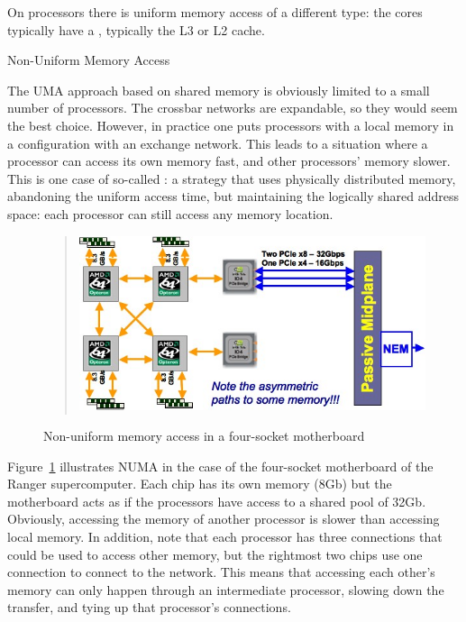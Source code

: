 On  processors there is uniform memory access of
a different type: the cores typically have a
, typically the L3 or L2 cache.

 {Non-Uniform Memory Access}
\label{sec:numa}

The \ac{UMA} approach based on shared memory 
is obviously limited to a small number of
processors. The crossbar networks are expandable, so they would seem 
the best choice. 
However, in practice one puts 
processors with a local memory in a configuration with an exchange
network. This leads to a situation where a processor can access its
own memory fast, and other processors' memory slower.
This is one case of so-called : a strategy that
uses physically distributed memory, abandoning the uniform access
time, but maintaining the logically shared address space: each processor can
still access any memory location.

\begin{figure}
  \begin{quote}
  \includegraphics[scale=.6]{graphics/ranger-numa}
  \end{quote}
  \caption{Non-uniform memory access in a four-socket motherboard}
  \label{fig:ranger-numa}
\end{figure}

Figure~\ref{fig:ranger-numa} illustrates \ac{NUMA} in the case of the
four-socket motherboard of the Ranger supercomputer. Each chip has its
own memory (8Gb) but the motherboard acts as if the processors have
access to a shared pool of 32Gb. Obviously, accessing the memory of
another processor is slower than accessing local memory. In addition,
note that each processor has three connections that could be used to
access other memory, but the rightmost two chips use one connection to
connect to the network. This means that accessing each other's memory
can only happen through an intermediate processor, slowing down the
transfer, and tying up that processor's connections.

